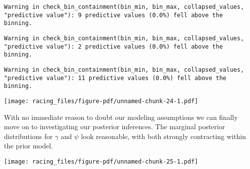 \documentclass[
  letterpaper,
  DIV=11,
  numbers=noendperiod]{scrartcl}
\newenvironment{Shaded}{\begin{snugshade}}{\end{snugshade}}
\newcommand{\AttributeTok}[1]{\textcolor[rgb]{0.40,0.45,0.13}{#1}}
\newcommand{\DecValTok}[1]{\textcolor[rgb]{0.68,0.00,0.00}{#1}}
\newcommand{\FunctionTok}[1]{\textcolor[rgb]{0.28,0.35,0.67}{#1}}
\newcommand{\NormalTok}[1]{\textcolor[rgb]{0.00,0.23,0.31}{#1}}
\newcommand{\SpecialCharTok}[1]{\textcolor[rgb]{0.37,0.37,0.37}{#1}}
\newcommand{\StringTok}[1]{\textcolor[rgb]{0.13,0.47,0.30}{#1}}
\begin{document}
\begin{verbatim}
Warning in check_bin_containment(bin_min, bin_max, collapsed_values,
"predictive value"): 9 predictive values (0.0%) fell above the binning.
\end{verbatim}

\begin{verbatim}
Warning in check_bin_containment(bin_min, bin_max, collapsed_values,
"predictive value"): 2 predictive values (0.0%) fell above the binning.
\end{verbatim}

\begin{verbatim}
Warning in check_bin_containment(bin_min, bin_max, collapsed_values,
"predictive value"): 11 predictive values (0.0%) fell above the binning.
\end{verbatim}

\texttt{[image: racing\_files/figure-pdf/unnamed-chunk-24-1.pdf]}

With no immediate reason to doubt our modeling assumptions we can
finally move on to investigating our posterior inferences. The marginal
posterior distributions for \(\gamma\) and \(\psi\) look reasonable,
with both strongly contracting within the prior model.

\begin{Shaded}
\end{Shaded}

\texttt{[image: racing\_files/figure-pdf/unnamed-chunk-25-1.pdf]}
\end{document}
